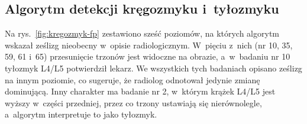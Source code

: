 \subsection{Algorytm detekcji kręgozmyku i~tyłozmyku}
\label{subsec:bledy-kregozmyk}

Na rys.~\ref{fig:kregozmyk-fp} zestawiono sześć poziomów, na których algorytm wskazał ześlizg nieobecny w~opisie radiologicznym.
W~pięciu z~nich (nr 10, 35, 59, 61 i~65) przesunięcie trzonów jest widoczne na obrazie, a~w~badaniu nr 10 tyłozmyk L4/L5 potwierdził lekarz.
We wszystkich tych badaniach opisano ześlizg na innym poziomie, co sugeruje, że radiolog odnotował jedynie zmianę dominującą.
Inny charakter ma badanie nr 2, w~którym krążek L4/L5 jest wyższy w~części przedniej, przez co trzony ustawiają się nierównolegle, a~algorytm interpretuje to jako tyłozmyk.

